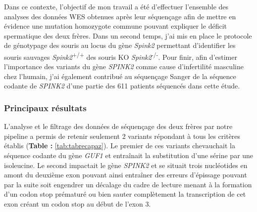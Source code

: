 \documentclass[12pt,a4paper,twoside]{ugathesis}
\begin{document}
Dans ce contexte, l'objectif de mon travail a été d'effectuer l'ensemble
des analyses des données WES obtenues après leur séquençage afin de
mettre en évidence une mutation homozygote commune pouvant expliquer le
déficit spermatique des deux frères. Dans un second temps, j'ai mis en
place le protocole de génotypage des souris au locus du gène
\emph{Spink2} permettant d'identifier les souris sauvages
\emph{Spink2}\textsuperscript{+/+} des souris KO
\emph{Spink2}\textsuperscript{-/-}. Pour finir, afin d'estimer
l'importance des variants du gène \emph{SPINK2} comme cause
d'infertilité masculine chez l'humain, j'ai également contribué au
séquençage Sanger de la séquence codante de \emph{SPINK2} d'une partie
des 611 patients séquencés dans cette étude.

\newpage



\newpage

\subsubsection{Principaux résultats}\label{principaux-resultats}

L'analyse et le filtrage des données de séquençage des deux frères par
notre pipeline a permis de retenir seulement 2 variants répondant à tous
les critères établis (\textbf{Table : }\ref{tab:tabrecapaz}). Le premier
de ces variants chevauchait la séquence codante du gène \emph{GUF1} et
entraînait la substitution d'une sérine par une isoleucine. Le second
impactait le gène \emph{SPINK2} et se situait trois nucléotides en amont
du deuxième exon pouvant ainsi entraîner des erreurs d'épissage pouvant
par la suite soit engendrer un décalage du cadre de lecture menant à la
formation d'un codon stop prématuré ou bien sauter complètement la
transcription de cet exon créant un codon stop au début de l'exon 3.
\end{document}
